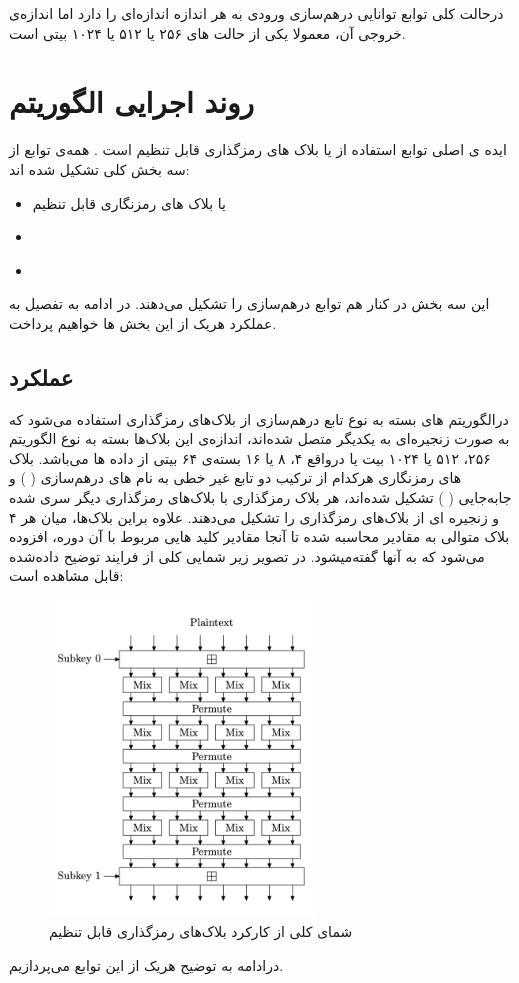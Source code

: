   درحالت کلی توابع
   توانایی درهم‌سازی ورودی به هر اندازه اندازه‌ای را دارد اما اندازه‌ی خروجی آن، معمولا یکی از حالت های ۲۵۶ یا ۵۱۲ یا ۱۰۲۴ بیتی است. 
  

\pagebreak
\section{
روند اجرایی الگوریتم
}
ایده ی اصلی توابع   استفاده از
\textit{ }
  یا بلاک های رمزگذاری قابل تنظیم است .
همه‌ی توابع 
از سه بخش کلی تشکیل شده اند:
\begin{itemize}
	\item 
	یا بلاک های رمزنگاری قابل تنظیم
	\item

	\item
	\textbf{ } 
	
\end{itemize}
این سه بخش در کنار هم توابع درهم‌سازی
را تشکیل می‌دهند.
 در ادامه به تفصیل به عملکرد هریک از این بخش ها خواهیم‌ پرداخت.
 
\subsection{
	عملکرد
}
در‌الگوریتم های 
 بسته به نوع تابع درهم‌سازی از بلاک‌های رمزگذاری استفاده می‌شود که به صورت زنجیره‌ای به یکدیگر متصل شده‌اند، اندازه‌ی این بلاک‌ها بسته به نوع الگوریتم 
 ۲۵۶، ۵۱۲ یا ۱۰۲۴ بیت یا درواقع ۴، ۸ یا ۱۶ بسته‌ی ۶۴ بیتی از داده ها ‌می‌باشد. بلاک های رمزنگاری هرکدام از ترکیب دو تابع غیر خطی به نام های درهم‌سازی
 (
\textit{ }
 )
 و جابه‌جایی (
 \textit{ }
)
تشکیل شده‌اند، هر بلاک رمزگذاری با بلاک‌های رمزگذاری دیگر سری شده و زنجیره ای از بلاک‌های رمزگذاری را تشکیل می‌دهند. علاوه براین بلاک‌ها، میان هر ۴ بلاک متوالی به مقادیر محاسبه شده تا آنجا مقادیر کلید هایی مربوط با آن دوره، افزوده می‌شود که به آنها 
\textit{}
گفته‌میشود. در تصویر زیر شمایی کلی از فرایند توضیح داده‌شده قابل مشاهده است:
\begin{figure}[H]
	\centering
	\includegraphics[width=7cm]{Images/Introduction/cipherblock_dataflow.png}	
	\caption{
		شمای کلی از کارکرد بلاک‌های رمزگذاری قابل تنظیم 
	}
\end{figure}
درادامه به توضیح هر‌یک از این توابع می‌پردازیم.
\pagebreak

